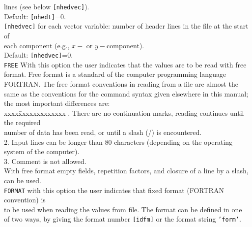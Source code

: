 \documentclass[12pt]{book}
\begin{document}
\begin{tabbing}
                       lines (see below {\tt [nhedvec]}).\\
                       Default: {\tt [nhedt]}=0.\-\\
{\tt [nhedvec]}     \> for each vector variable: number of header lines in the file at the start of\+\\
                       each component (e.g., $x-$ or $y-$component).\\
                       Default: {\tt [nhedvec]}=0.\-\\
{\tt FREE}          \> With this option the user indicates that the values are to be read with free\+\\
                       format. Free format is a standard of the computer programming language\\
                       FORTRAN. The free format conventions in reading from a file are almost the\\
                       same as the conventions for the command syntax given elsewhere in this manual;\\
                       the most important differences are:\\
                       \pushtabs
                       xxxx\=xxxxxxxxxxxxx . \> There are no continuation marks, reading continues until the required\+\\
                             number of data has been read, or until a slash (/) is encountered.\-\\
                       2. \> Input lines can be longer than 80 characters (depending on the operating\+\\
                             system of the computer).\-\\
                       3. \> Comment is not allowed.\\
                       \poptabs
                       With free format empty fields, repetition factors, and closure of a line by a slash,\\
                       can be used.\-\\
{\tt FORMAT}        \> with this option the user indicates that fixed format (FORTRAN convention) is\+\\
                       to be used when reading the values from file. The format can be defined in one\\
                       of two ways, by giving the format number {\tt [idfm]} or the format string {\tt 'form'}.\-\\

\end{tabbing}
\end{document}
